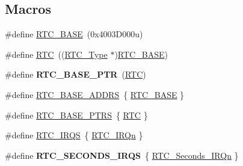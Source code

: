\subsection*{Macros}
\begin{DoxyCompactItemize}
\item 
\#define \hyperlink{group__RTC__Peripheral__Access__Layer_ga4265e665d56225412e57a61d87417022}{R\+T\+C\+\_\+\+B\+A\+SE}~(0x4003\+D000u)
\item 
\#define \hyperlink{group__RTC__Peripheral__Access__Layer_ga5359a088f5d8b20ce74d920e46059304}{R\+TC}~((\hyperlink{structRTC__Type}{R\+T\+C\+\_\+\+Type} $\ast$)\hyperlink{group__RTC__Peripheral__Access__Layer_ga4265e665d56225412e57a61d87417022}{R\+T\+C\+\_\+\+B\+A\+SE})
\item 
\#define {\bfseries R\+T\+C\+\_\+\+B\+A\+S\+E\+\_\+\+P\+TR}~(\hyperlink{group__RTC__Peripheral__Access__Layer_ga5359a088f5d8b20ce74d920e46059304}{R\+TC})\hypertarget{group__RTC__Peripheral__Access__Layer_ga6455e2b767b4b224b4f00b50e87a2441}{}\label{group__RTC__Peripheral__Access__Layer_ga6455e2b767b4b224b4f00b50e87a2441}

\item 
\#define \hyperlink{group__RTC__Peripheral__Access__Layer_ga417e8fb70b5f6eef161b10f664daa363}{R\+T\+C\+\_\+\+B\+A\+S\+E\+\_\+\+A\+D\+D\+RS}~\{ \hyperlink{group__RTC__Peripheral__Access__Layer_ga4265e665d56225412e57a61d87417022}{R\+T\+C\+\_\+\+B\+A\+SE} \}
\item 
\#define \hyperlink{group__RTC__Peripheral__Access__Layer_ga426dff8af34f3304d58b5bed5a54e583}{R\+T\+C\+\_\+\+B\+A\+S\+E\+\_\+\+P\+T\+RS}~\{ \hyperlink{group__RTC__Peripheral__Access__Layer_ga5359a088f5d8b20ce74d920e46059304}{R\+TC} \}
\item 
\#define \hyperlink{group__RTC__Peripheral__Access__Layer_gaa24243a5e7ef8be5eeeedde3eaaa366e}{R\+T\+C\+\_\+\+I\+R\+QS}~\{ \hyperlink{group__Interrupt__vector__numbers_gga666eb0caeb12ec0e281415592ae89083adcc0f2770f7f57f75fac3d8bcac0e858}{R\+T\+C\+\_\+\+I\+R\+Qn} \}
\item 
\#define {\bfseries R\+T\+C\+\_\+\+S\+E\+C\+O\+N\+D\+S\+\_\+\+I\+R\+QS}~\{ \hyperlink{group__Interrupt__vector__numbers_gga666eb0caeb12ec0e281415592ae89083a2212c7b8ea636a7df0c31f21556e4fae}{R\+T\+C\+\_\+\+Seconds\+\_\+\+I\+R\+Qn} \}\hypertarget{group__RTC__Peripheral__Access__Layer_ga9d5d6f8bbcb56fa1073bebb9d130faad}{}\label{group__RTC__Peripheral__Access__Layer_ga9d5d6f8bbcb56fa1073bebb9d130faad}


\end{DoxyCompactItemize}
